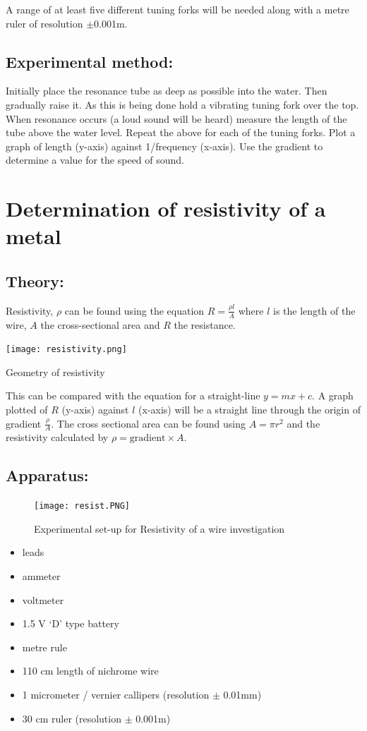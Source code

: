 A range of at least five different tuning forks will be needed along with a metre ruler of resolution $\pm$0.001m. 
\subsection{Experimental method:}

Initially place the resonance tube as deep as possible into the water. Then gradually raise it. As this is being done hold a vibrating tuning fork over the top. When resonance occurs (a loud sound will be heard) measure the length of the tube above the water level.  Repeat the above for each of the tuning forks. Plot a graph of length (y-axis) against 1/frequency (x-axis). Use the gradient to determine a value for the speed of sound.
\section{Determination of resistivity of a metal}
\subsection{Theory:}  Resistivity, $\rho$ can be found using the equation $R=\frac{\rho l}{A}$ where $l$ is the length of the wire, $A$ the cross-sectional area and $R$ the resistance.\begin{marginfigure}
\texttt{[image: resistivity.png]}
\caption{Geometry of resistivity}
\end{marginfigure} This can be compared with the equation for a straight-line $ y = mx +c$. A graph plotted of $R$ (y-axis) against $l$ (x-axis) will be a straight line through the origin of gradient $\frac{\rho}{A}$. The cross sectional area can be found using $A=\pi r^{2}$ and the resistivity calculated by $ \rho = \text{gradient} \times A$.  
\subsection{Apparatus:} 
\begin{figure}
\texttt{[image: resist.PNG]}
\caption{Experimental set-up for Resistivity of a wire investigation}
\end{figure}
\begin{itemize}
\item leads 
\item ammeter 
\item voltmeter 
\item 1.5 V `D' type battery 
\item metre rule 
\item 110 cm length of nichrome wire
\item 1 micrometer / vernier callipers (resolution $\pm$ 0.01mm)  
\item 30 cm ruler (resolution $\pm$ 0.001m)  
\end{itemize}
